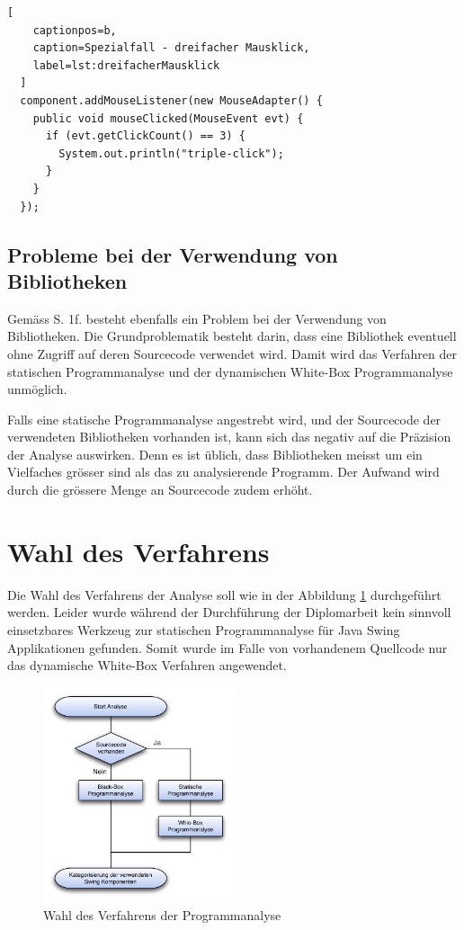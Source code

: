   \begin{lstlisting}[
    captionpos=b,
    caption=Spezialfall - dreifacher Mausklick,
    label=lst:dreifacherMausklick
  ]
  component.addMouseListener(new MouseAdapter() {
    public void mouseClicked(MouseEvent evt) {
      if (evt.getClickCount() == 3) {
        System.out.println("triple-click");
      }
    }
  });
  \end{lstlisting}
  
  \subsection{Probleme bei der Verwendung von Bibliotheken}
  
  Gemäss \cite{GUIAnalysenUndBibliotheken} S. 1f. besteht ebenfalls ein Problem
  bei der Verwendung von Bibliotheken. Die Grundproblematik besteht darin,
  dass eine Bibliothek eventuell ohne Zugriff auf deren Sourcecode verwendet
  wird. Damit wird das Verfahren der statischen Programmanalyse und der
  dynamischen White-Box Programmanalyse unmöglich.
  
  Falls eine statische Programmanalyse angestrebt wird, und der Sourcecode der
  verwendeten Bibliotheken vorhanden ist, kann sich das negativ auf die
  Präzision der Analyse auswirken. Denn es ist üblich, dass Bibliotheken
  meisst um ein Vielfaches grösser sind als das zu analysierende Programm. Der
  Aufwand wird durch die grössere Menge an Sourcecode zudem erhöht.
  
  \section{Wahl des Verfahrens}
  
  Die Wahl des Verfahrens der Analyse soll wie in der Abbildung
  \ref{img:guiAnalyse} durchgeführt werden. Leider wurde während der
  Durchführung der Diplomarbeit kein sinnvoll einsetzbares Werkzeug zur
  statischen Programmanalyse für Java Swing Applikationen gefunden. Somit wurde
  im Falle von vorhandenem Quellcode nur das dynamische White-Box Verfahren
  angewendet.
  
  \begin{figure}[ht]
    \begin{center}
      \includegraphics[width=0.5\textwidth]{./image/guiAnalyse.pdf}
      \caption{Wahl des Verfahrens der Programmanalyse}
      \label{img:guiAnalyse}
    \end{center}
  \end{figure}